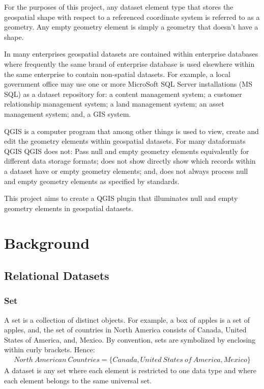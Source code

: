 \documentclass[letterpaper,11pt,english]{sphinxmanual}
\begin{document}
For the purposes of this project, any dataset element type that stores the geospatial shape with respect to a referenced coordinate system is referred to as a geometry.  Any empty geometry element is simply a geometry that doesn’t have a shape.

In many enterprises geospatial datasets are contained within enterprise databases where frequently the same brand of enterprise database is used elsewhere within the same enterprise to contain non-spatial datasets.  For example, a local government office may use one or more MicroSoft SQL Server installations (MS SQL) as a dataset repository for: a content management system; a customer relationship management system; a land management system; an asset management system; and, a GIS system.

QGIS  is a computer program that among other things is used to view, create and edit the geometry elements within geospatial datasets.  For many dataformats QGIS  QGIS does not: Pass null and empty geometry elements equivalently for different data storage formats; does not show directly show which records within a dataset have  or empty geometry elements; and, does not always process null and empty geometry elements as specified by standards.

This project aims to create a QGIS plugin that illuminates null and empty geometry elements in geospatial datasets.


\section{Background}
\label{\detokenize{concept:background}}

\subsection{Relational Datasets}
\label{\detokenize{concept:relational-datasets}}

\subsubsection{Set}
\label{\detokenize{concept:set}}
A set is a collection of distinct objects.  For example, a box of apples is a set of apples, and, the set of countries in North America consists of Canada,  United States of America, and, Mexico.  By convention, sets are symbolized by enclosing within curly brackets.  Hence:
\begin{equation*}
\begin{split}North\ American\ Countries = \{Canada, United\ States\ of\ America, Mexico\}\end{split}
\end{equation*}
A dataset is any set where each element is restricted to one data type and where each element belongs to the same universal set.
\end{document}
